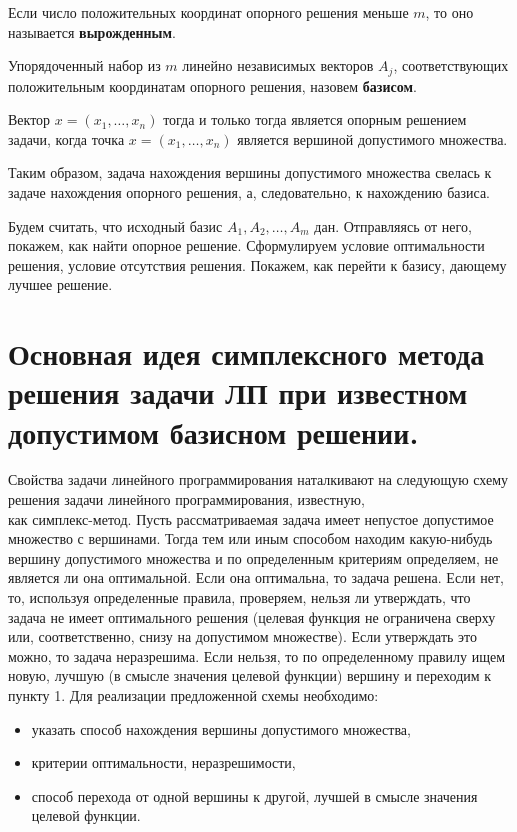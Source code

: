 \documentclass[17pt]{extarticle}
\begin{document}
\begin{definition}
    Если число положительных координат опорного решения меньше \( m \), то оно называется \textbf{вырожденным}.
\end{definition}

\begin{definition}
    Упорядоченный набор из \( m \) линейно независимых векторов \( A_j \), соответствующих положительным координатам опорного решения,
    назовем \textbf{базисом}.
\end{definition}

\begin{theorem}
    Вектор \( x = (x_1, \ldots, x_n) \) тогда и только тогда является опорным решением задачи, когда точка \( x = (x_1, \ldots, x_n) \) является вершиной допустимого множества.
\end{theorem}

Таким образом, задача нахождения вершины допустимого множества свелась к задаче нахождения опорного решения, а, следовательно, к нахождению базиса.

Будем считать, что исходный базис \( A_1, A_2, \ldots, A_m \) дан.
Отправляясь от него, покажем, как найти опорное решение.
Сформулируем условие оптимальности решения, условие отсутствия решения.
Покажем, как перейти к базису, дающему лучшее решение.



\section{Основная идея симплексного метода решения задачи ЛП при известном допустимом базисном решении.}
Свойства задачи линейного программирования наталкивают на следующую схему решения задачи линейного программирования,
известную, \\
как симплекс-метод.
Пусть рассматриваемая задача имеет непустое допустимое множество с вершинами.
Тогда тем или иным способом находим какую-нибудь вершину допустимого
множества и по определенным критериям определяем, не является ли она
оптимальной.
Если она оптимальна, то задача решена. Если нет, то, используя определенные правила, проверяем,
нельзя ли утверждать, что задача не имеет оптимального решения (целевая функция не ограничена
сверху или, соответственно, снизу на допустимом множестве).
Если утверждать это можно, то задача неразрешима. Если нельзя, то по определенному правилу ищем новую,
лучшую (в смысле значения целевой функции) вершину и переходим к пункту 1.
Для реализации предложенной схемы необходимо:
\begin{itemize}
    \item указать способ нахождения вершины допустимого множества,
    \item критерии оптимальности, неразрешимости,
    \item способ перехода от одной вершины к другой, лучшей в смысле значения целевой функции.
\end{itemize}
\end{document}
